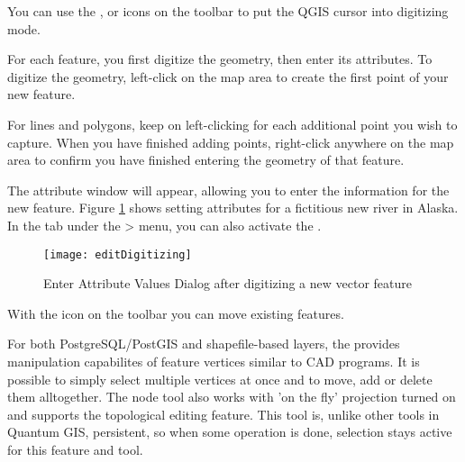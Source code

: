 
You can use the ,
 or
 icons on the toolbar to
put the QGIS cursor into digitizing mode.  

For each feature, you first digitize the geometry, then enter its attributes.
To digitize the geometry, left-click on the map area to create the first
point of your new feature.

For lines and polygons, keep on left-clicking for each additional
point you wish to capture.  When you have finished adding points,
right-click anywhere on the map area to confirm you have finished entering
the geometry of that feature.

The attribute window will appear, allowing you to enter the information for
the new feature. Figure \ref{fig:vector_digitising} shows setting attributes
for a fictitious new river in Alaska. In the  tab under the
 > menu, you can also activate the 
.

\begin{figure}[ht]
   \begin{center}
   \caption{Enter Attribute Values Dialog after digitizing a new vector
   feature \nixcaption}\label{fig:vector_digitising}\smallskip
   \texttt{[image: editDigitizing]}
\end{center}  
\end{figure}

With the  icon on the toolbar
you can move existing features.

\begin{Tip}[ht]\caption{\textsc{Attribute Value Types}}
\end{Tip}


For both PostgreSQL/PostGIS and shapefile-based layers, the 
 provides manipulation capabilites
of feature vertices similar to CAD programs. It is possible to simply select
multiple vertices at once and to move, add or delete them alltogether. The node
tool also works with 'on the fly' projection turned on and supports
the topological editing feature. This tool is, unlike other tools in Quantum GIS,
persistent, so when some operation is done, selection stays active for this
feature and tool.

